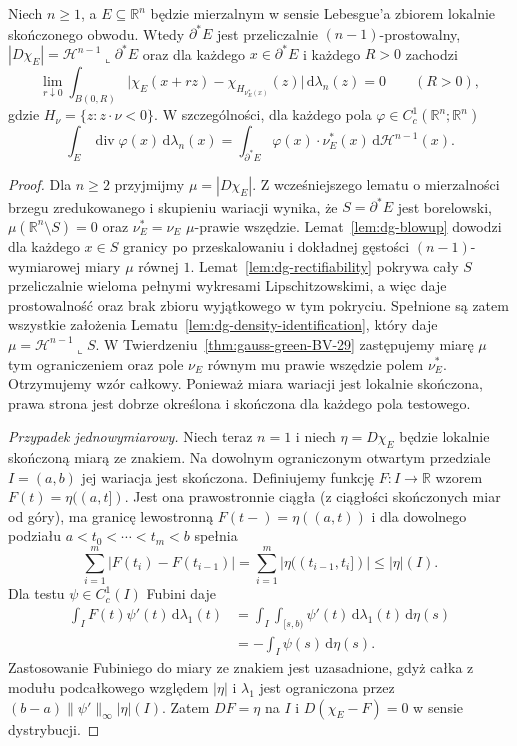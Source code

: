 \begin{twierdzenie}
\label{thm:de-giorgi-structure-29}
Niech $n\ge1$, a $E\subseteq\mathbb R^n$ będzie
mierzalnym w sensie Lebesgue'a zbiorem lokalnie
skończonego obwodu. Wtedy
$\partial^*E$ jest przeliczalnie $(n-1)$-prostowalny,
$|D\chi_E|=\mathcal H^{n-1}\llcorner\partial^*E$
oraz dla każdego $x\in\partial^*E$ i każdego $R>0$
zachodzi
\[
 \lim_{r\downarrow0}\int_{B(0,R)}
 \bigl|\chi_E(x+rz)-\chi_{H_{\nu_E^*(x)}}(z)\bigr|
 \,\mathrm d\lambda_n(z)=0\qquad(R>0),
\]
gdzie $H_\nu=\{z:z\cdot\nu<0\}$.
W szczególności, dla każdego pola
$\varphi\in C_c^1(\mathbb R^n;\mathbb R^n)$
\[
 \int_E\operatorname{div}\varphi(x)\,\mathrm d\lambda_n(x)
 =\int_{\partial^*E}\varphi(x)\cdot\nu_E^*(x)
 \,\mathrm d\mathcal H^{n-1}(x).
\]
\end{twierdzenie}
\begin{proof}
Dla $n\ge2$ przyjmijmy $\mu=|D\chi_E|$.
Z wcześniejszego lematu o mierzalności
brzegu zredukowanego i skupieniu wariacji wynika,
że $S=\partial^*E$ jest borelowski,
$\mu(\mathbb R^n\setminus S)=0$ oraz
$\nu_E^*=\nu_E$ $\mu$-prawie wszędzie.
Lemat~\ref{lem:dg-blowup} dowodzi dla każdego
$x\in S$ granicy po przeskalowaniu i dokładnej
gęstości $(n-1)$-wymiarowej miary $\mu$ równej $1$.
Lemat~\ref{lem:dg-rectifiability} pokrywa cały $S$
przeliczalnie wieloma pełnymi wykresami
Lipschitzowskimi, a więc daje prostowalność
oraz brak zbioru wyjątkowego w tym pokryciu.
Spełnione są zatem wszystkie założenia
Lematu~\ref{lem:dg-density-identification},
który daje $\mu=\mathcal H^{n-1}\llcorner S$.
W Twierdzeniu~\ref{thm:gauss-green-BV-29}
zastępujemy miarę $\mu$ tym ograniczeniem
oraz pole $\nu_E$ równym mu prawie wszędzie
polem $\nu_E^*$. Otrzymujemy wzór całkowy.
Ponieważ miara wariacji jest lokalnie skończona,
prawa strona jest dobrze określona i skończona
dla każdego pola testowego.

\emph{Przypadek jednowymiarowy.}
Niech teraz $n=1$ i niech $\eta=D\chi_E$
będzie lokalnie skończoną miarą ze znakiem.
Na dowolnym ograniczonym otwartym przedziale
$I=(a,b)$ jej wariacja jest skończona.
Definiujemy funkcję $F:I\to\mathbb R$ wzorem
$F(t)=\eta((a,t])$. Jest ona prawostronnie
ciągła (z ciągłości skończonych miar od góry),
ma granicę lewostronną
$F(t-)=\eta((a,t))$ i dla dowolnego podziału
$a<t_0<\cdots<t_m<b$ spełnia
\[
 \sum_{i=1}^m|F(t_i)-F(t_{i-1})|
 =\sum_{i=1}^m|\eta((t_{i-1},t_i])|
 \le|\eta|(I).
\]
Dla testu $\psi\in C_c^1(I)$ Fubini daje
\begin{align*}
 \int_I F(t)\psi'(t)\,\mathrm d\lambda_1(t)
 &=\int_I\int_{[s,b)}\psi'(t)
 \,\mathrm d\lambda_1(t)\,\mathrm d\eta(s)\\
 &=-\int_I\psi(s)\,\mathrm d\eta(s).
\end{align*}
Zastosowanie Fubiniego do miary ze znakiem
jest uzasadnione, gdyż całka z modułu
podcałkowego względem $|\eta|$ i $\lambda_1$
jest ograniczona przez
$(b-a)\|\psi'\|_\infty|\eta|(I)$.
Zatem $DF=\eta$ na $I$ i
$D(\chi_E-F)=0$ w sensie dystrybucji.


\end{proof}
